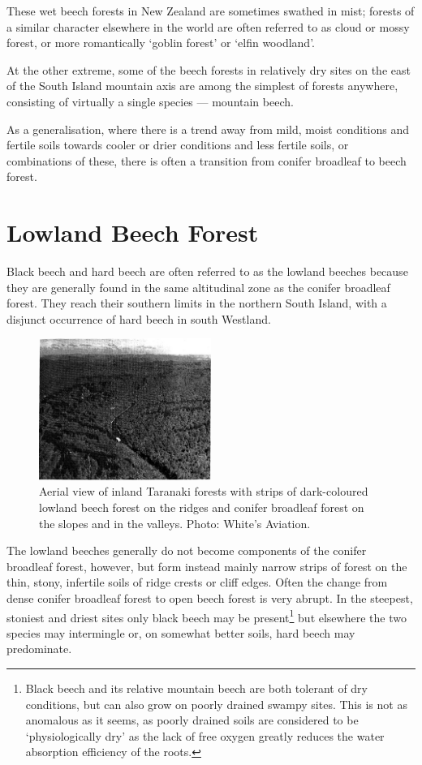 These wet beech forests in New Zealand are sometimes swathed in mist; forests of a similar character elsewhere in the world are often referred to as cloud or mossy forest, or more romantically `goblin forest' or `elfin woodland'.

At the other extreme, some of the beech forests in relatively dry sites on the east of the South Island mountain axis are among the simplest of forests anywhere, consisting of virtually a single species — mountain beech.

As a generalisation, where there is a trend away from mild, moist conditions and fertile soils towards cooler or drier conditions and less fertile soils, or combinations of these, there is often a transition from conifer broadleaf to beech forest.

\section{Lowland Beech Forest}

Black beech and hard beech are often referred to as the lowland beeches because they are generally found in the same altitudinal zone as the conifer broadleaf forest.
They reach their southern limits in the northern South Island, with a disjunct occurrence of hard beech in south Westland.

\begin{figure}
	\includegraphics[width=0.5\textwidth]{graphics/figure73taranaki-forests.jpg}
	\centering
	\caption[Aerial view of inland Taranaki forests]{Aerial view of inland Taranaki forests with strips of dark-coloured lowland beech forest on the ridges and conifer broadleaf forest on the slopes and in the valleys.
	Photo: White's Aviation.}
	\label{fig:73taranaki-forests}
\end{figure}

The lowland beeches generally do not become components of the conifer broadleaf forest, however, but form instead mainly narrow strips of forest on the thin, stony, infertile soils of ridge crests or cliff edges.
Often the change from dense conifer broadleaf forest to open beech forest is very abrupt.
In the steepest, stoniest and driest sites only black beech may be present\footnote{Black beech and its relative mountain beech are both tolerant of dry conditions, but can also grow on poorly drained swampy sites. This is not as anomalous as it seems, as poorly drained soils are considered to be `physiologically dry' as the lack of free oxygen greatly reduces the water absorption efficiency of the roots.} but elsewhere the two species may intermingle or, on somewhat better soils, hard beech may predominate.

